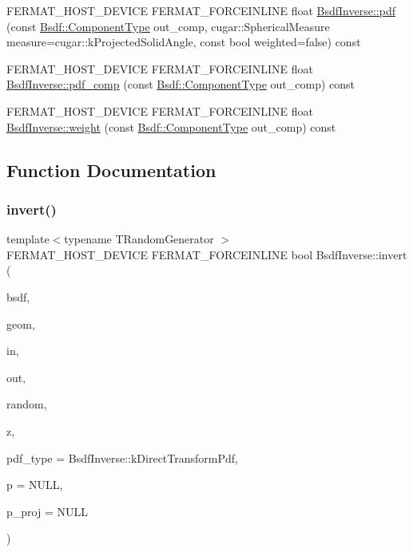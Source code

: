 \begin{DoxyCompactItemize}
\item 
F\+E\+R\+M\+A\+T\+\_\+\+H\+O\+S\+T\+\_\+\+D\+E\+V\+I\+CE F\+E\+R\+M\+A\+T\+\_\+\+F\+O\+R\+C\+E\+I\+N\+L\+I\+NE float \hyperlink{group___path_module_gae689ddf830059ea1ebe7a235c954b25f}{Bsdf\+Inverse\+::pdf} (const \hyperlink{struct_bsdf_a5f7db6f81220ed9ee6da109d6eb5b585}{Bsdf\+::\+Component\+Type} out\+\_\+comp, cugar\+::\+Spherical\+Measure measure=cugar\+::k\+Projected\+Solid\+Angle, const bool weighted=false) const
\item 
F\+E\+R\+M\+A\+T\+\_\+\+H\+O\+S\+T\+\_\+\+D\+E\+V\+I\+CE F\+E\+R\+M\+A\+T\+\_\+\+F\+O\+R\+C\+E\+I\+N\+L\+I\+NE float \hyperlink{group___path_module_gaad6ea81c789229423f13731f4d7b1088}{Bsdf\+Inverse\+::pdf\+\_\+comp} (const \hyperlink{struct_bsdf_a5f7db6f81220ed9ee6da109d6eb5b585}{Bsdf\+::\+Component\+Type} out\+\_\+comp) const
\item 
F\+E\+R\+M\+A\+T\+\_\+\+H\+O\+S\+T\+\_\+\+D\+E\+V\+I\+CE F\+E\+R\+M\+A\+T\+\_\+\+F\+O\+R\+C\+E\+I\+N\+L\+I\+NE float \hyperlink{group___path_module_ga26ab6168a450774594081beba929f9fa}{Bsdf\+Inverse\+::weight} (const \hyperlink{struct_bsdf_a5f7db6f81220ed9ee6da109d6eb5b585}{Bsdf\+::\+Component\+Type} out\+\_\+comp) const
\end{DoxyCompactItemize}


\subsection{Function Documentation}
\mbox{\label{group___path_module_gabf86c201c8bc8e874d935f3eeae66269}} 
\subsubsection{\texorpdfstring{invert()}{invert()}}
{\footnotesize\ttfamily template$<$typename T\+Random\+Generator $>$ \\
F\+E\+R\+M\+A\+T\+\_\+\+H\+O\+S\+T\+\_\+\+D\+E\+V\+I\+CE F\+E\+R\+M\+A\+T\+\_\+\+F\+O\+R\+C\+E\+I\+N\+L\+I\+NE bool Bsdf\+Inverse\+::invert (\begin{DoxyParamCaption}\item[{const \hyperlink{struct_bsdf}{Bsdf} \&}]{bsdf,  }\item[{const \hyperlink{struct_vertex_geometry}{Vertex\+Geometry} \&}]{geom,  }\item[{const \hyperlink{structcugar_1_1_vector}{cugar\+::\+Vector3f} \&}]{in,  }\item[{const \hyperlink{structcugar_1_1_vector}{cugar\+::\+Vector3f} \&}]{out,  }\item[{T\+Random\+Generator \&}]{random,  }\item[{\hyperlink{structcugar_1_1_vector}{cugar\+::\+Vector3f} \&}]{z,  }\item[{Bsdf\+Inverse\+::\+Pdf\+Type}]{pdf\+\_\+type = {\ttfamily BsdfInverse\+:\+:kDirectTransformPdf},  }\item[{float $\ast$}]{p = {\ttfamily NULL},  }\item[{float $\ast$}]{p\+\_\+proj = {\ttfamily NULL} }\end{DoxyParamCaption})}

